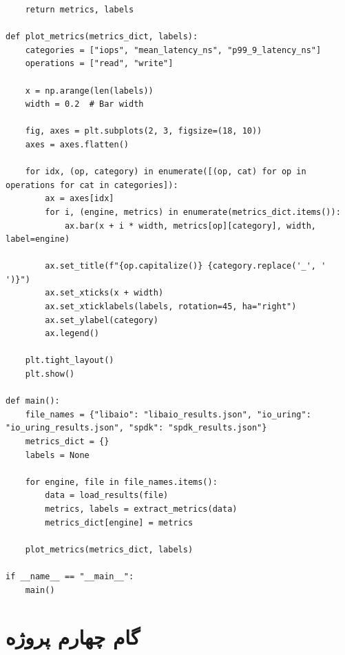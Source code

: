 \documentclass[12pt]{article}
\begin{document}
{\begin{latin}
\begin{lstlisting}
    return metrics, labels

def plot_metrics(metrics_dict, labels):
    categories = ["iops", "mean_latency_ns", "p99_9_latency_ns"]
    operations = ["read", "write"]
    
    x = np.arange(len(labels))
    width = 0.2  # Bar width
    
    fig, axes = plt.subplots(2, 3, figsize=(18, 10))
    axes = axes.flatten()
    
    for idx, (op, category) in enumerate([(op, cat) for op in operations for cat in categories]):
        ax = axes[idx]
        for i, (engine, metrics) in enumerate(metrics_dict.items()):
            ax.bar(x + i * width, metrics[op][category], width, label=engine)
        
        ax.set_title(f"{op.capitalize()} {category.replace('_', ' ')}")
        ax.set_xticks(x + width)
        ax.set_xticklabels(labels, rotation=45, ha="right")
        ax.set_ylabel(category)
        ax.legend()
    
    plt.tight_layout()
    plt.show()

def main():
    file_names = {"libaio": "libaio_results.json", "io_uring": "io_uring_results.json", "spdk": "spdk_results.json"}
    metrics_dict = {}
    labels = None
    
    for engine, file in file_names.items():
        data = load_results(file)
        metrics, labels = extract_metrics(data)
        metrics_dict[engine] = metrics
    
    plot_metrics(metrics_dict, labels)

if __name__ == "__main__":
    main()
\end{lstlisting}
\end{latin}

\newpage
\section*{گام چهارم پروژه}
}
\end{document}
